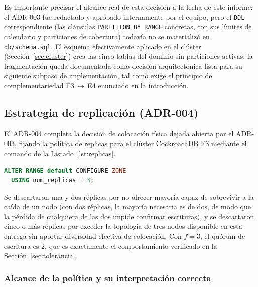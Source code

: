 \documentclass[10pt,twocolumn]{article}
\begin{document}
Es importante precisar el alcance real de esta decisión a la fecha de este
informe: el ADR-003 fue redactado y aprobado internamente por el equipo,
pero el \texttt{DDL} correspondiente (las cláusulas
\texttt{PARTITION BY RANGE} concretas, con sus límites de calendario y
particiones de cobertura) todavía no se materializó en
\texttt{db/schema.sql}. El esquema efectivamente aplicado en el clúster
(Sección~\ref{sec:cluster}) crea las cinco tablas del dominio sin
particiones activas; la fragmentación queda documentada como decisión
arquitectónica lista para su siguiente subpaso de implementación, tal como
exige el principio de complementariedad E3\,$\rightarrow$\,E4 enunciado en
la introducción.

\subsection{Estrategia de replicación (ADR-004)}

El ADR-004 completa la decisión de colocación física dejada abierta por el
ADR-003, fijando la política de réplicas para el clúster CockroachDB E3
mediante el comando de la Listado~\ref{lst:replicas}.

\begin{lstlisting}[language=sql,caption={Política de replicación del clúster E3 (ADR-004).},label={lst:replicas}]
ALTER RANGE default CONFIGURE ZONE
  USING num_replicas = 3;
\end{lstlisting}

Se descartaron una y dos réplicas por no ofrecer mayoría capaz de
sobrevivir a la caída de un nodo (con dos réplicas, la mayoría necesaria es
de dos, de modo que la pérdida de cualquiera de las dos impide confirmar
escrituras), y se descartaron cinco o más réplicas por exceder la topología
de tres nodos disponible en esta entrega sin aportar diversidad efectiva de
colocación. Con $f=3$, el quórum de escritura es $2$, que es exactamente el
comportamiento verificado en la Sección~\ref{sec:tolerancia}.

\subsubsection{Alcance de la política y su interpretación correcta}
\end{document}

